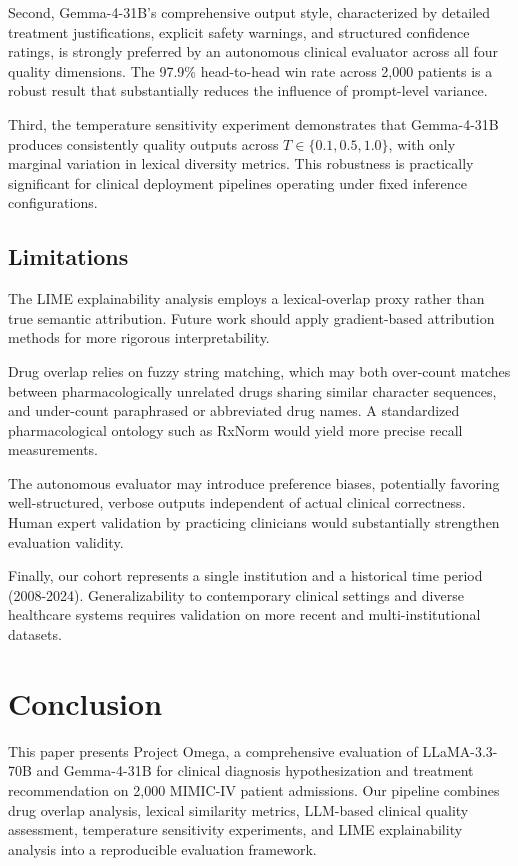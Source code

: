 \documentclass[10pt, twocolumn, a4paper]{article}
\begin{document}
Second, Gemma-4-31B's comprehensive output style, characterized by detailed treatment justifications, explicit safety warnings, and structured confidence ratings, is strongly preferred by an autonomous clinical evaluator across all four quality dimensions. The 97.9\% head-to-head win rate across 2,000 patients is a robust result that substantially reduces the influence of prompt-level variance.

Third, the temperature sensitivity experiment demonstrates that Gemma-4-31B produces consistently quality outputs across $T \in \{0.1, 0.5, 1.0\}$, with only marginal variation in lexical diversity metrics. This robustness is practically significant for clinical deployment pipelines operating under fixed inference configurations.

\subsection{Limitations}
The LIME explainability analysis employs a lexical-overlap proxy rather than true semantic attribution. Future work should apply gradient-based attribution methods for more rigorous interpretability.

Drug overlap relies on fuzzy string matching, which may both over-count matches between pharmacologically unrelated drugs sharing similar character sequences, and under-count paraphrased or abbreviated drug names. A standardized pharmacological ontology such as RxNorm would yield more precise recall measurements.

The autonomous evaluator may introduce preference biases, potentially favoring well-structured, verbose outputs independent of actual clinical correctness. Human expert validation by practicing clinicians would substantially strengthen evaluation validity.

Finally, our cohort represents a single institution and a historical time period (2008-2024). Generalizability to contemporary clinical settings and diverse healthcare systems requires validation on more recent and multi-institutional datasets.

\section{Conclusion}

This paper presents Project Omega, a comprehensive evaluation of LLaMA-3.3-70B and Gemma-4-31B for clinical diagnosis hypothesization and treatment recommendation on 2,000 MIMIC-IV patient admissions. Our pipeline combines drug overlap analysis, lexical similarity metrics, LLM-based clinical quality assessment, temperature sensitivity experiments, and LIME explainability analysis into a reproducible evaluation framework.
\end{document}
